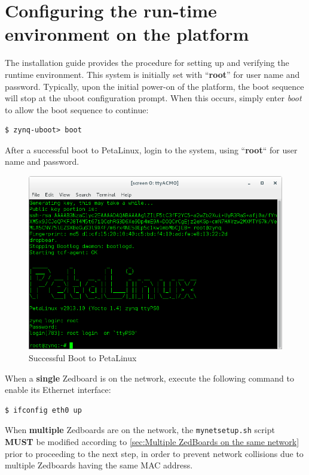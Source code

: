 \section{Configuring the run-time environment on the platform}
The installation guide provides the procedure for setting up and verifying the runtime environment.
This system is initially set with  ``\textbf{root}'' for user name and password.
Typically, upon the initial power-on of the platform, the boot sequence will stop at the uboot configuration prompt. When this occurs, simply enter \textit{boot} to allow the boot sequence to continue:
\begin{verbatim}
$ zynq-uboot> boot
\end{verbatim}
\begin{flushleft}
After a successful boot to PetaLinux, login to the system, using  ``\textbf{root}`` for user name and password.

\begin{figure}[H]
	\centerline{\includegraphics[scale=0.5]{zed_boot}}
	\caption{Successful Boot to PetaLinux}
	\label{fig:boot1}
\end{figure}

When a \textbf{single} Zedboard is on the network, execute the following command to enable its Ethernet interface:
\begin{verbatim}
$ ifconfig eth0 up
\end{verbatim}
When \textbf{multiple} Zedboards are on the network, the \texttt{mynetsetup.sh} script \textbf{MUST} be modified according to \ref{sec:Multiple ZedBoards on the same network} prior to proceeding to the next step, in order to prevent network collisions due to multiple Zedboards having the same MAC address.
\end{flushleft}


